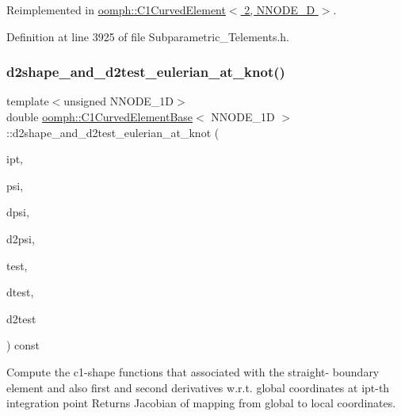 Reimplemented in \hyperlink{classoomph_1_1C1CurvedElement_3_012_00_01NNODE__1D_01_4_a4fc4db790fca7513a3e8ceb0a7a61507}{oomph\+::\+C1\+Curved\+Element$<$ 2, N\+N\+O\+D\+E\+\_\+D $>$}.



Definition at line 3925 of file Subparametric\+\_\+\+Telements.\+h.

\mbox{\label{classoomph_1_1C1CurvedElementBase_a758d1f61da5c350b194b3421d30f394d}} 
\subsubsection{\texorpdfstring{d2shape\+\_\+and\+\_\+d2test\+\_\+eulerian\+\_\+at\+\_\+knot()}{d2shape\_and\_d2test\_eulerian\_at\_knot()}}
{\footnotesize\ttfamily template$<$unsigned N\+N\+O\+D\+E\+\_\+1D$>$ \\
double \hyperlink{classoomph_1_1C1CurvedElementBase}{oomph\+::\+C1\+Curved\+Element\+Base}$<$ N\+N\+O\+D\+E\+\_\+1D $>$\+::d2shape\+\_\+and\+\_\+d2test\+\_\+eulerian\+\_\+at\+\_\+knot (\begin{DoxyParamCaption}\item[{const unsigned \&}]{ipt,  }\item[{\hyperlink{classoomph_1_1Shape}{Shape} \&}]{psi,  }\item[{\hyperlink{classoomph_1_1DShape}{D\+Shape} \&}]{dpsi,  }\item[{\hyperlink{classoomph_1_1DShape}{D\+Shape} \&}]{d2psi,  }\item[{\hyperlink{classoomph_1_1Shape}{Shape} \&}]{test,  }\item[{\hyperlink{classoomph_1_1DShape}{D\+Shape} \&}]{dtest,  }\item[{\hyperlink{classoomph_1_1DShape}{D\+Shape} \&}]{d2test }\end{DoxyParamCaption}) const\hspace{0.3cm}{\ttfamily [inline]}}



Compute the c1-\/shape functions that associated with the straight-\/ boundary element and also first and second derivatives w.\+r.\+t. global coordinates at ipt-\/th integration point Returns Jacobian of mapping from global to local coordinates. 




